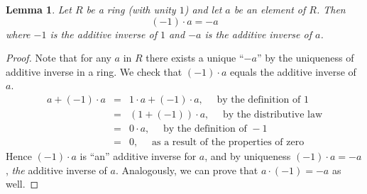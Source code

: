 \documentclass[12pt]{article}
\newtheorem{lemma}{Lemma}
\begin{document}
\begin{lemma}
Let $R$ be a ring (with unity $1$) and let $a$ be an element of $R$. Then 
$$(-1)\cdot a = -a$$
where $-1$ is the additive inverse of $1$ and $-a$ is the additive inverse of $a$.
\end{lemma}
\begin{proof}
Note that for any $a$ in $R$ there exists a unique ``$-a$'' by the uniqueness of additive inverse in a ring. We check that $(-1)\cdot a$ equals the additive inverse of $a$.
\begin{eqnarray*}
a+(-1)\cdot a &=& 1\cdot a + (-1)\cdot a, \quad \text{ by the definition of }1\\
&=& (1+ (-1))\cdot a, \quad \text{ by the distributive law}\\
&=& 0\cdot a,\quad \text{ by the definition of }-1\\
&=& 0, \quad \text{ as a result of the properties of zero} 
\end{eqnarray*}
Hence $(-1)\cdot a$ is ``an'' additive inverse for $a$, and by uniqueness $(-1)\cdot a = -a$, {\it the} additive inverse of $a$. Analogously, we can prove that $a\cdot (-1) = -a$ as well.
\end{proof}
\end{document}
